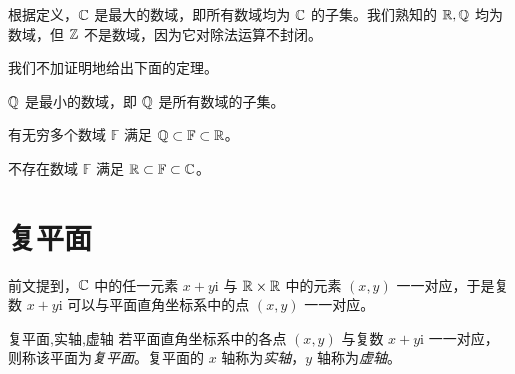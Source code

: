 根据定义，$\mathbb C$ 是最大的数域，即所有数域均为 $\mathbb C$ 的子集。我们熟知的 $\mathbb R, \mathbb Q$ 均为数域，但 $\mathbb Z$ 不是数域，因为它对除法运算不封闭。

我们不加证明地给出下面的定理。

\begin{theorem}
	$\mathbb Q$ 是最小的数域，即 $\mathbb Q$ 是所有数域的子集。
\end{theorem}

\begin{theorem}
	有无穷多个数域 $\mathbb F$ 满足 $\mathbb Q \subset \mathbb F \subset \mathbb R$。
\end{theorem}

\begin{theorem}
	不存在数域 $\mathbb F$ 满足 $\mathbb R \subset \mathbb F \subset \mathbb C$。
\end{theorem}

\section{复平面}

前文提到，$\mathbb C$ 中的任一元素 $x + y \mathrm i$ 与 $\mathbb R \times \mathbb R$ 中的元素 $(x, y)$ 一一对应，于是复数 $x + y \mathrm i$ 可以与平面直角坐标系中的点 $(x, y)$ 一一对应。

\begin{definition}{复平面,实轴,虚轴}
	若平面直角坐标系中的各点 $(x, y)$ 与复数 $x + y \mathrm i$ 一一对应，则称该平面为\emph{复平面}。复平面的 $x$ 轴称为\emph{实轴}，$y$ 轴称为\emph{虚轴}。
\end{definition}